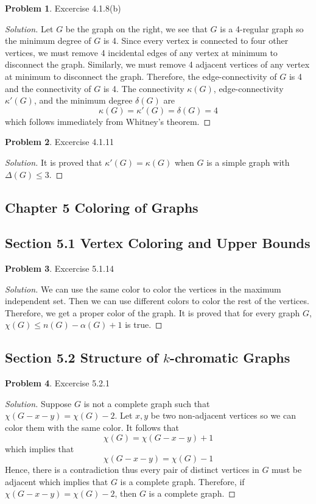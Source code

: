 \documentclass[12pt]{article}
\theoremstyle{definition}
\newtheorem{problem}{Problem}
\newenvironment*{solution}{\begin{proof}[Solution]}{\end{proof}}
\begin{document}
\begin{problem}
    Excercise 4.1.8(b)
\end{problem}
\begin{solution}
    Let \(G\) be the graph on the right, we see that \(G\) is a 4-regular
    graph so the minimum degree of \(G\) is 4.
    Since every vertex is connected to four other vertices,
    we must remove 4 incidental edges of any vertex at minimum to disconnect
    the graph.
    Similarly, we must remove 4 adjacent vertices of any vertex at minimum to
    disconnect the graph.
    Therefore, the edge-connectivity of \(G\) is 4 and the connectivity of
    \(G\) is 4.
    The connectivity \(\kappa(G)\), edge-connectivity \(\kappa'(G)\), and the
    minimum degree \(\delta(G)\) are
    \[\kappa(G) = \kappa'(G) = \delta(G) = 4\] which follows immediately from
    Whitney's theorem.
\end{solution}

\begin{problem}
    Excercise 4.1.11
\end{problem}
\begin{solution}
    It is proved that \(\kappa'(G)=\kappa(G)\) when \(G\) is a simple graph
    with \(\Delta(G)\leq3\).
\end{solution}

\subsection*{Chapter 5 Coloring of Graphs}
\subsection*{Section 5.1 Vertex Coloring and Upper Bounds}
\begin{problem}
    Excercise 5.1.14
\end{problem}
\begin{solution}
    We can use the same color to color the vertices in the maximum independent
    set.
    Then we can use different colors to color the rest of the vertices.
    Therefore, we get a proper color of the graph.
    It is proved that for every graph \(G\), \(\chi(G) \leq n(G)-\alpha(G)+1\)
    is true.
\end{solution}

\subsection*{Section 5.2 Structure of \(k\)-chromatic Graphs}
\begin{problem}
    Excercise 5.2.1
\end{problem}
\begin{solution}
    Suppose \(G\) is not a complete graph such that
    \(\chi(G-x-y) = \chi(G)-2\).
    Let \(x,y\) be two non-adjacent vertices so we can color them with the
    same color.
    It follows that \[\chi(G) = \chi(G-x-y)+1\] which implies that
    \[\chi(G-x-y) = \chi(G)-1\]
    Hence, there is a contradiction thus every pair of distinct vertices in
    \(G\) must be adjacent which implies that \(G\) is a complete graph.
    Therefore, if \(\chi(G-x-y) = \chi(G)-2\), then \(G\) is a complete graph.
\end{solution}
\end{document}
